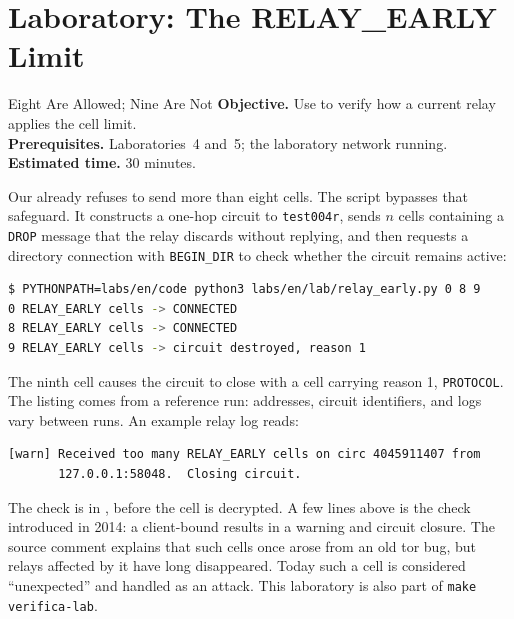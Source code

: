 \section{Laboratory: The RELAY\_EARLY Limit}\label{sec:lab-casi}

\begin{laboratorio}[17]{Eight Are Allowed; Nine Are Not}
\textbf{Objective.} Use  to verify how a current relay applies the  cell limit.\\
\textbf{Prerequisites.} Laboratories~4 and~5; the laboratory network running.\\
\textbf{Estimated time.} 30 minutes.
\end{laboratorio}

Our  already refuses to send more than eight  cells. The  script bypasses that safeguard. It constructs a one-hop circuit to \texttt{test004r}, sends $n$  cells containing a \texttt{DROP} message that the relay discards without replying, and then requests a directory connection with \texttt{BEGIN\_DIR} to check whether the circuit remains active:
\begin{lstlisting}[language=bash,numbers=none]
$ PYTHONPATH=labs/en/code python3 labs/en/lab/relay_early.py 0 8 9
0 RELAY_EARLY cells -> CONNECTED
8 RELAY_EARLY cells -> CONNECTED
9 RELAY_EARLY cells -> circuit destroyed, reason 1
\end{lstlisting}
The ninth cell causes the circuit to close with a  cell carrying reason 1, \texttt{PROTOCOL}. The listing comes from a reference run: addresses, circuit identifiers, and logs vary between runs. An example relay log reads:
\begin{lstlisting}[numbers=none]
[warn] Received too many RELAY_EARLY cells on circ 4045911407 from
       127.0.0.1:58048.  Closing circuit.
\end{lstlisting}
The check is in , before the cell is decrypted. A few lines above is the check introduced in 2014: a client-bound  results in a warning and circuit closure. The source comment explains that such cells once arose from an old tor bug, but relays affected by it have long disappeared. Today such a cell is considered \enquote{unexpected} and handled as an attack. This laboratory is also part of \texttt{make verifica-lab}.

